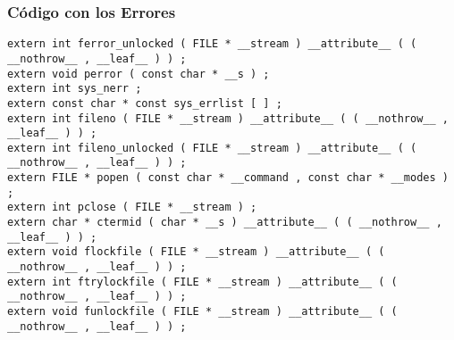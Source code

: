 \documentclass{beamer}
\begin{document}
\begin{frame}[fragile]
\frametitle{C\'odigo con los Errores}
\begin{lstlisting}[style=CStyle]
extern int ferror_unlocked ( FILE * __stream ) __attribute__ ( ( __nothrow__ , __leaf__ ) ) ; 
extern void perror ( const char * __s ) ; 
extern int sys_nerr ; 
extern const char * const sys_errlist [ ] ; 
extern int fileno ( FILE * __stream ) __attribute__ ( ( __nothrow__ , __leaf__ ) ) ; 
extern int fileno_unlocked ( FILE * __stream ) __attribute__ ( ( __nothrow__ , __leaf__ ) ) ; 
extern FILE * popen ( const char * __command , const char * __modes ) ; 
extern int pclose ( FILE * __stream ) ; 
extern char * ctermid ( char * __s ) __attribute__ ( ( __nothrow__ , __leaf__ ) ) ; 
extern void flockfile ( FILE * __stream ) __attribute__ ( ( __nothrow__ , __leaf__ ) ) ; 
extern int ftrylockfile ( FILE * __stream ) __attribute__ ( ( __nothrow__ , __leaf__ ) ) ; 
extern void funlockfile ( FILE * __stream ) __attribute__ ( ( __nothrow__ , __leaf__ ) ) ; \end{lstlisting}
\end{frame}
\end{document}
